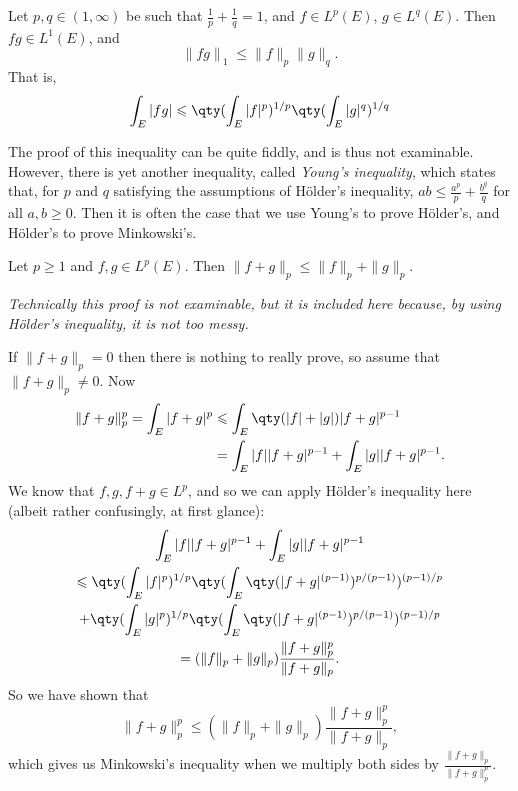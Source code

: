 \documentclass{maths}
\begin{document}
\begin{lem}
    Let $p,q\in(1,\infty)$ be such that $\frac{1}{p}+\frac{1}{q}=1$, and $f\in L^p(E)$, $g\in L^q(E)$.
    Then $fg\in L^1(E)$, and
    \[
        \|fg\|_{~1} \leqslant\|f\|_p \|g\|_q.
    \]
    That is,
    \[
        \int_E |fg| \leqslant
        \qty(\int_E |f|^p)^{1/p} \qty(\int_E |g|^q)^{1/q}
    \]
\end{lem}

\begin{prf}
    The proof of this inequality can be quite fiddly, and is thus not examinable.
    However, there is yet another inequality, called \emph{Young's inequality}, which states that, for $p$ and $q$ satisfying the assumptions of H\"older's inequality, $ab\leqslant\frac{a^p}{p}+\frac{b^q}{q}$ for all $a,b\geqslant0$.
    Then it is often the case that we use Young's to prove H\"older's, and H\"older's to prove Minkowski's.
\end{prf}

\begin{lem}
    Let $p\geqslant1$ and $f,g\in L^p(E)$.
    Then $\|f+g\|_p\leqslant\|f\|_p+\|g\|_p$.
\end{lem}

\begin{prf}
    \emph{Technically this proof is not examinable, but it is included here because, by using H\"older's inequality, it is not too messy.}

    If $\|f+g\|_p=0$ then there is nothing to really prove, so assume that $\|f+g\|_p\neq0$.
    Now
    \begin{align*}
        \|f + g\|_p^p =
        \int_E |f + g|^p
        &\leqslant \int_E \qty(|f| + |g|) |f + g|^{p-1}\\
        &= \int_E |f||f + g|^{p-1} + \int_E |g||f + g|^{p-1}.
    \end{align*}
    We know that $f,g,f+g\in L^p$, and so we can apply H\"older's inequality here (albeit rather confusingly, at first glance):
    \begin{gather*}
        \int_E |f||f + g|^{p-1} + \int_E |g||f + g|^{p-1}\\
        \leqslant \qty(\int_E |f|^p)^{1/p} \qty(\int_E \qty(|f+g|^{(p-1)})^{p/(p-1)})^{(p-1)/p}\\
        + \qty(\int_E |g|^p)^{1/p} \qty(\int_E \qty(|f+g|^{(p-1)})^{p/(p-1)})^{(p-1)/p}\\
        = (\|f\|_p + \|g\|_p) \frac{\|f+g\|_p^p}{\|f+g\|_p}.
    \end{gather*}
    So we have shown that
    \[
        \|f+g\|_p^p \leqslant
        (\|f\|_p + \|g\|_p) \frac{\|f+g\|_p^p}{\|f+g\|_p},
    \]
    which gives us Minkowski's inequality when we multiply both sides by $\frac{\|f+g\|_p}{\|f+g\|_p^p}$.
\end{prf}
\end{document}
